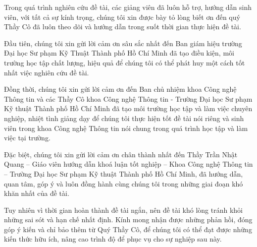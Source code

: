 \thispagestyle{fancy}
Trong quá trình nghiên cứu đề tài, các giảng viên đã luôn hỗ trợ, hướng dẫn sinh viên, với tất cả sự kính trọng, chúng tôi xin được bày tỏ lòng biết ơn đến quý Thầy Cô đã luôn theo dõi và hướng dẫn trong suốt thời gian thực hiện đề tài.

Đầu tiên, chúng tôi xin gửi lời cảm ơn sâu sắc nhất đến Ban giám hiệu trường Đại học Sư phạm Kỹ Thuật Thành phố Hồ Chí Minh đã tạo điều kiện, môi trường học tập chất lượng, hiệu quả để chúng tôi có thể phát huy một cách tốt nhất việc nghiên cứu đề tài.

Đồng thời, chúng tôi xin gửi lời cảm ơn đến Ban chủ nhiệm khoa Công nghệ Thông tin và các Thầy Cô khoa Công nghệ Thông tin - Trường Đại học Sư phạm Kỹ thuật Thành phố Hồ Chí Minh đã tạo môi trường học tập và làm việc chuyên nghiệp, nhiệt tình giảng dạy để chúng tôi thực hiện tốt đề tài nói riêng và sinh viên trong khoa Công nghệ Thông tin nói chung trong quá trình học tập và làm việc tại trường.

Đặc biệt, chúng tôi xin gửi lời cảm ơn chân thành nhất đến Thầy Trần Nhật Quang – Giáo viên hướng dẫn khoá luận tốt nghiệp – Khoa Công nghệ Thông tin – Trường Đại học Sư phạm Kỹ thuật Thành phố Hồ Chí Minh, đã hướng dẫn, quan tâm, góp ý và luôn đồng hành cùng chúng tôi trong những giai đoạn khó khăn nhất của đề tài.

Tuy nhiên vì thời gian hoàn thành đề tài ngắn, nên đề tài khó lòng tránh khỏi những sai sót và hạn chế nhất định. Kính mong nhận được những phản hồi, đóng góp ý kiến và chỉ bảo thêm từ Quý Thầy Cô, để chúng tôi có thể đạt được những kiến thức hữu ích, nâng cao trình độ để phục vụ cho sự nghiệp sau này.
